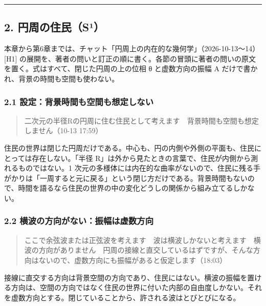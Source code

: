 \documentclass[
  a4paper,
]{ltjsarticle}
\begin{document}
\begin{center}\rule{0.5\linewidth}{0.5pt}\end{center}

\subsection{2.
円周の住民（S¹）}\label{ux5186ux5468ux306eux4f4fux6c11suxb9}

本章から第6章までは、チャット「円周上の内在的な幾何学」（2026-10-13〜14）{[}H1{]}
の展開を、著者の問いと訂正の順に書く。各節の冒頭に著者の問いの原文を置く。式はすべて、閉じた円周の上の位相
θ と虚数方向の振幅 A だけで書かれ、背景の時間も空間も使わない。

\subsubsection{2.1
設定：背景時間も空間も想定しない}\label{ux8a2dux5b9aux80ccux666fux6642ux9593ux3082ux7a7aux9593ux3082ux60f3ux5b9aux3057ux306aux3044}

\begin{quote}
二次元の半径Rの円周に住む住民として考えます　背景時間も空間も想定しません（10-13
17:59）
\end{quote}

住民の世界は閉じた円周だけである。中心も、円の内側や外側の平面も、住民にとっては存在しない。「半径
R」は外から見たときの言葉で、住民が内側から測れるものではない。1
次元の多様体には内在的な曲率がないので、住民に残る手がかりは「一周すると元に戻る」という閉じ方だけである。背景時間もないので、時間を語るなら住民の世界の中の変化どうしの関係から組み立てるしかない。

\subsubsection{2.2
横波の方向がない：振幅は虚数方向}\label{ux6a2aux6ce2ux306eux65b9ux5411ux304cux306aux3044ux632fux5e45ux306fux865aux6570ux65b9ux5411}

\begin{quote}
ここで余弦波または正弦波を考えます　波は横波しかないと考えます　横波の方向がありません　円周の接線と直交しているはずですが、そんな方向はないので、虚数方向にも振幅があると仮定します（18:03）
\end{quote}

接線に直交する方向は背景空間の方向であり、住民にはない。横波の振幅を置ける方向は、空間の方向ではなく住民の世界に付いた内部の自由度しかない。それを虚数方向とする。閉じていることから、許される波はとびとびになる。
\end{document}
